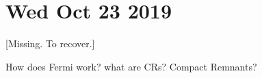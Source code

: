 \documentclass[main.tex]{subfiles}
\begin{document}
\section*{Wed Oct 23 2019}
[Missing. To recover.]

How does Fermi work? what are CRs? Compact Remnants?
\end{document}
